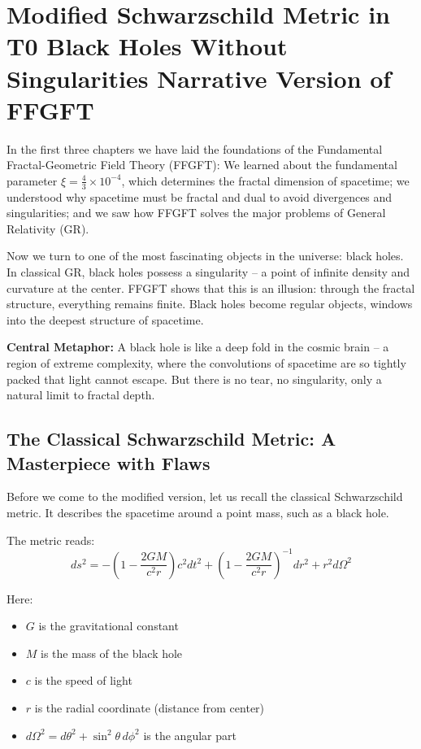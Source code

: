 \chapter{Modified Schwarzschild Metric in T0  Black Holes Without Singularities  Narrative Version of FFGFT}



In the first three chapters we have laid the foundations of the Fundamental Fractal-Geometric Field Theory (FFGFT): We learned about the fundamental parameter $\xi = \frac{4}{3} \times 10^{-4}$, which determines the fractal dimension of spacetime; we understood why spacetime must be fractal and dual to avoid divergences and singularities; and we saw how FFGFT solves the major problems of General Relativity (GR).

Now we turn to one of the most fascinating objects in the universe: black holes. In classical GR, black holes possess a singularity -- a point of infinite density and curvature at the center. FFGFT shows that this is an illusion: through the fractal structure, everything remains finite. Black holes become regular objects, windows into the deepest structure of spacetime.

\textbf{Central Metaphor:} A black hole is like a deep fold in the cosmic brain -- a region of extreme complexity, where the convolutions of spacetime are so tightly packed that light cannot escape. But there is no tear, no singularity, only a natural limit to fractal depth.

\section{The Classical Schwarzschild Metric: A Masterpiece with Flaws}

Before we come to the modified version, let us recall the classical Schwarzschild metric. It describes the spacetime around a point mass, such as a black hole.

The metric reads:
\begin{equation}
ds^2 = -\left(1 - \frac{2GM}{c^2 r}\right) c^2 dt^2 + \left(1 - \frac{2GM}{c^2 r}\right)^{-1} dr^2 + r^2 d\Omega^2
\end{equation}

Here:
\begin{itemize}[leftmargin=*]
\item $G$ is the gravitational constant
\item $M$ is the mass of the black hole
\item $c$ is the speed of light
\item $r$ is the radial coordinate (distance from center)
\item $d\Omega^2 = d\theta^2 + \sin^2\theta\, d\phi^2$ is the angular part
\end{itemize}

